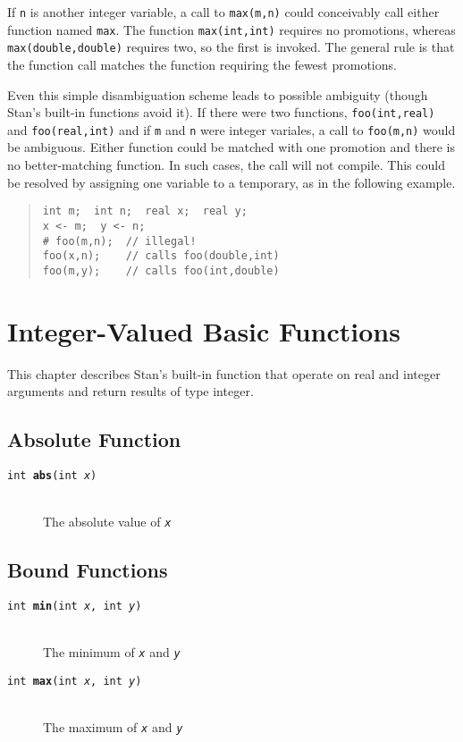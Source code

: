 \documentclass[10pt]{report}
\newcommand{\Stan}{Stan\xspace}
\newcommand{\code}[1]{{\tt #1}}
\newcommand{\fitem}[4]{\item[{\tt #1 {\bfseries #2}(#3)}]\mbox{ } \\[4pt] #4}
\newcommand{\farg}[1]{{\tt\slshape #1}}
\begin{document}
If \code{n} is another integer variable, a call to \code{max(m,n)}
could conceivably call either function named \code{max}.  The function
\code{max(int,int)} requires no promotions, whereas
\code{max(double,double)} requires two, so the first is invoked.  The
general rule is that the function call matches the function requiring
the fewest promotions.

Even this simple disambiguation scheme leads to possible ambiguity
(though \Stan's built-in functions avoid it).  If there were two functions,
\code{foo(int,real)} and \code{foo(real,int)} and if \code{m} and
\code{n} were integer variales, a call to \code{foo(m,n)} would be
ambiguous.  Either function could be matched with one promotion and
there is no better-matching function.  In such cases, the call will
not compile.  This could be resolved by assigning one variable to a
temporary, as in the following example.
%
\begin{quote}
\begin{Verbatim}
int m;  int n;  real x;  real y;  
x <- m;  y <- n;
# foo(m,n);  // illegal!
foo(x,n);    // calls foo(double,int)
foo(m,y);    // calls foo(int,double)
\end{Verbatim}
\end{quote}





\chapter{Integer-Valued Basic Functions}

This chapter describes \Stan's built-in function that operate on real
and integer arguments and return results of type integer.

\section{Absolute Function}

\begin{description}
%
\fitem{int}{abs}{int \farg{x}}{
The absolute value of \farg{x}}
%
\end{description}
%

\section{Bound Functions}
%
\begin{description}
\fitem{int}{min}{int \farg{x}, int \farg{y}}{
The minimum of \farg{x} and \farg{y}}
%
\fitem{int}{max}{int \farg{x}, int \farg{y}}{
The maximum of \farg{x} and \farg{y}}
%
\end{description}
\end{document}
